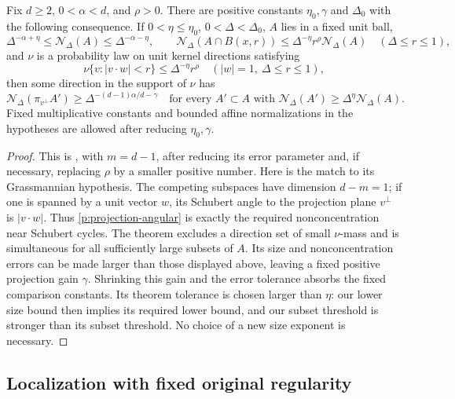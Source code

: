 \begin{proposition}\label{p:projection}
Fix $d\geq2$, $0<\alpha<d$, and $\rho>0$.  There are positive constants
$\eta_0,\gamma$ and $\Delta_0$ with the following consequence.  If
$0<\eta\leq\eta_0$, $0<\Delta<\Delta_0$, $A$ lies in a fixed unit ball,
\[
 \Delta^{-\alpha+\eta}\leq\mathcal N_\Delta(A)
 \leq\Delta^{-\alpha-\eta},\qquad
 \mathcal N_\Delta(A\cap B(x,r))
 \leq\Delta^{-\eta}r^\rho\mathcal N_\Delta(A)
 \quad(\Delta\leq r\leq1),
\]
and $\nu$ is a probability law on unit kernel directions satisfying
\begin{equation}\label{p:projection-angular}
 \nu\{v:|v\cdot w|<r\}\leq\Delta^{-\eta}r^\rho
 \quad(|w|=1,\ \Delta\leq r\leq1),
\end{equation}
then some direction in the support of $\nu$ has
\begin{equation}\label{p:projection-conclusion}
 \mathcal N_\Delta(\pi_{v^\perp}A')
 \geq\Delta^{-(d-1)\alpha/d-\gamma}
 \quad\text{for every }A'\subset A\text{ with }
 \mathcal N_\Delta(A')\geq\Delta^\eta\mathcal N_\Delta(A).
\end{equation}
Fixed multiplicative constants and bounded affine normalizations in the
hypotheses are allowed after reducing $\eta_0,\gamma$.
\end{proposition}
\begin{proof}
This is \citet[Theorem~1]{He2020}, with $m=d-1$, after reducing its error
parameter and, if necessary, replacing $\rho$ by a smaller positive number.
Here is the match to its Grassmannian hypothesis.  The competing subspaces
have dimension $d-m=1$; if one is spanned by a unit vector $w$, its Schubert
angle to the projection plane $v^\perp$ is $|v\cdot w|$.  Thus
\eqref{p:projection-angular} is exactly the required nonconcentration near
Schubert cycles.  The theorem excludes a direction set of small $\nu$-mass and
is simultaneous for all sufficiently large subsets of $A$.  Its size and
nonconcentration errors can be made larger than those displayed above, leaving
a fixed positive projection gain $\gamma$.  Shrinking this gain and the error
tolerance absorbs the fixed comparison constants.  Its theorem tolerance is chosen larger than $\eta$: our lower size bound
then implies its required lower bound, and our subset threshold is stronger
than its subset threshold.  No choice of a new size exponent is necessary.
\end{proof}

\subsection{Localization with fixed original regularity}

